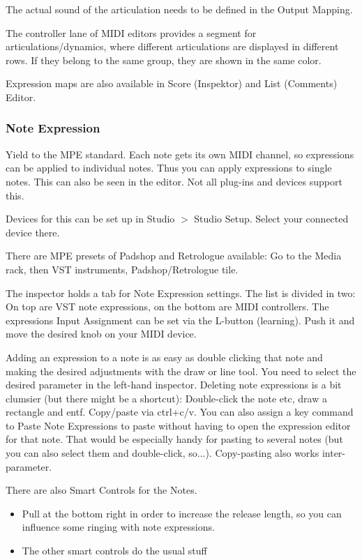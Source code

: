 \documentclass[10pt]{article}
\begin{document}
The actual sound of the articulation needs to be defined in the Output Mapping.

The controller lane of MIDI editors provides a segment for articulations/dynamics, where different articulations are displayed in different rows. If they belong to the same group, they are shown in the same color.

Expression maps are also available in Score (Inspektor) and List (Comments) Editor.

\subsubsection{Note Expression}

Yield to the MPE standard. Each note gets its own MIDI channel, so expressions can be applied to individual notes. Thus you can apply expressions to single notes. This can also be seen in the editor. Not all plug-ins and devices support this.

Devices for this can be set up in Studio $>$ Studio Setup. Select your connected device there.

There are MPE presets of Padshop and Retrologue available: Go to the Media rack, then VST instruments, Padshop/Retrologue tile.

The inspector holds a tab for Note Expression settings. The list is divided in two: On top are VST note expressions, on the bottom are MIDI controllers. The expressions Input Assignment can be set via the L-button (learning). Push it and move the desired knob on your MIDI device.

Adding an expression to a note is as easy as double clicking that note and making the desired adjustments with the draw or line tool. You need to select the desired parameter in the left-hand inspector. Deleting note expressions is a bit clumsier (but there might be a shortcut): Double-click the note etc, draw a rectangle and entf. Copy/paste via ctrl+c/v. You can also assign a key command to Paste Note Expressions to paste without having to open the expression editor for that note. That would be especially handy for pasting to several notes (but you can also select them and double-click, so...). Copy-pasting also works inter-parameter.

There are also Smart Controls for the Notes.
\begin{itemize}
	\item Pull at the bottom right in order to increase the release length, so you can influence some ringing with note expressions.
	\item The other smart controls do the usual stuff
\end{itemize}
\end{document}
